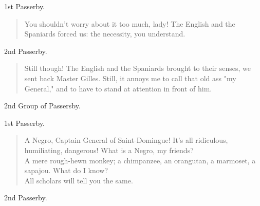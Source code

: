 \documentclass[letterpaper,article,12pt,oneside,notitlepage]{memoir}
\begin{document}
\begin{center}1st Passerby.\end{center}

\begin{verse}
\indent You shouldn't worry about it too much, lady! The English and the Spaniards forced us: the necessity, you understand. \\
\end{verse}

\begin{center}2nd Passerby.\end{center}

\begin{verse}
\indent Still though! The English and the Spaniards brought to their senses, we sent back Master Gilles. Still, it annoys me to call that old ass "my General," and to have to stand at attention in front of him. \\
\end{verse}

\begin{center}2nd Group of Passersby.\end{center}

\begin{center}1st Passerby.\end{center}

\begin{verse}
\indent A Negro, Captain General of Saint-Domingue! It's all ridiculous, humiliating, dangerous! What is a Negro, my friends? \\
\indent A mere rough-hewn monkey; a chimpanzee, an orangutan, a marmoset, a sapajou. What do I know? \\
\hspace{1cm} All scholars will tell you the same. \\
\end{verse}

\begin{center}2nd Passerby.\end{center}
\end{document}

